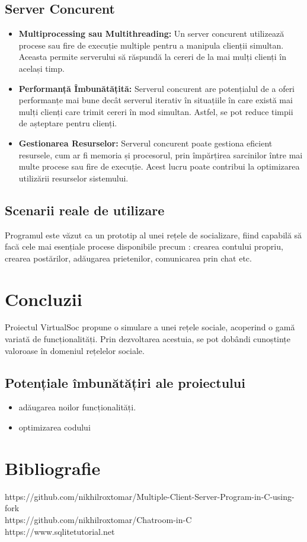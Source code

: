 \documentclass{article}
\begin{document}
\subsection*{Server Concurent}

\begin{itemize}

    \item \textbf{Multiprocessing sau Multithreading:} Un server concurent utilizează procese sau fire de execuție multiple pentru a manipula clienții simultan. Aceasta permite serverului să răspundă la cereri de la mai mulți clienți în același timp.

    \item \textbf{Performanță Îmbunătățită:} Serverul concurent are potențialul de a oferi performanțe mai bune decât serverul iterativ în situațiile în care există mai mulți clienți care trimit cereri în mod simultan. Astfel, se pot reduce timpii de așteptare pentru clienți.

    \item \textbf{Gestionarea Resurselor:} Serverul concurent poate gestiona eficient resursele, cum ar fi memoria și procesorul, prin împărțirea sarcinilor între mai multe procese sau fire de execuție. Acest lucru poate contribui la optimizarea utilizării resurselor sistemului.

\end{itemize}

\subsection{Scenarii reale de utilizare}

Programul este văzut ca un prototip al unei rețele de socializare, fiind capabilă să facă cele mai esențiale procese disponibile precum : crearea contului propriu, crearea postărilor, adăugarea prietenilor, comunicarea prin chat etc.

\section{Concluzii}

Proiectul VirtualSoc  propune o simulare  a unei rețele sociale, acoperind o gamă variată de funcționalități. Prin dezvoltarea acestuia, se pot dobândi cunoștințe valoroase în domeniul rețelelor sociale.

\subsection*{Potențiale îmbunătățiri ale proiectului}

\begin{itemize}

    \item adăugarea noilor funcționalități.
    \item optimizarea codului

\end{itemize}

\section{Bibliografie}

https://github.com/nikhilroxtomar/Multiple-Client-Server-Program-in-C-using-fork
\\
https://github.com/nikhilroxtomar/Chatroom-in-C
\\
https://www.sqlitetutorial.net
\end{document}
